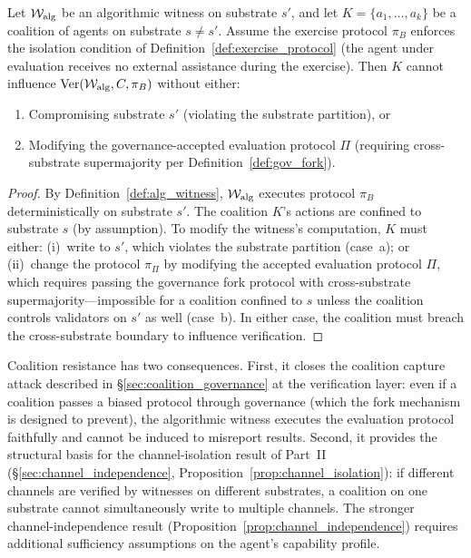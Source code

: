 \begin{proposition}
\label{prop:coalition_resistance}
Let $\mathcal{W}_{\mathrm{alg}}$ be an algorithmic witness on substrate
$s'$, and let $K = \{a_1, \ldots, a_k\}$ be a coalition of agents on
substrate $s \neq s'$.  Assume the exercise protocol $\pi_B$ enforces
the isolation condition of Definition~\ref{def:exercise_protocol}
(the agent under evaluation receives no external assistance during
the exercise).  Then $K$ cannot influence
$\mathrm{Ver}(\mathcal{W}_{\mathrm{alg}}, C, \pi_B)$ without either:
\begin{enumerate}
    \item[(a)] Compromising substrate $s'$ (violating the substrate
    partition), or
    \item[(b)] Modifying the governance-accepted evaluation protocol $\Pi$
    (requiring cross-substrate supermajority per
    Definition~\ref{def:gov_fork}).
\end{enumerate}
\end{proposition}

\begin{proof}
By Definition~\ref{def:alg_witness}, $\mathcal{W}_{\mathrm{alg}}$
executes protocol $\pi_B$ deterministically on substrate $s'$.  The
coalition $K$'s actions are confined to substrate $s$ (by assumption).
To modify the witness's computation, $K$ must either: (i)~write to
$s'$, which violates the substrate partition (case~a); or (ii)~change
the protocol $\pi_\Pi$ by modifying the accepted evaluation protocol $\Pi$, which
requires passing the governance fork protocol with cross-substrate
supermajority---impossible for a coalition confined to $s$ unless the
coalition controls validators on $s'$ as well (case~b).  In either
case, the coalition must breach the cross-substrate boundary to
influence verification.
\end{proof}

Coalition resistance has two consequences.  First, it closes the
coalition capture attack described in \S\ref{sec:coalition_governance}
at the verification layer: even if a coalition passes a biased protocol
through governance (which the fork mechanism is designed to prevent), the
algorithmic witness executes the evaluation protocol faithfully and cannot be
induced to misreport results.  Second, it provides the structural
basis for the channel-isolation result of Part~II
(\S\ref{sec:channel_independence},
Proposition~\ref{prop:channel_isolation}): if different channels are
verified by witnesses on different substrates, a coalition on one
substrate cannot simultaneously write to multiple channels.  The
stronger channel-independence result
(Proposition~\ref{prop:channel_independence}) requires additional
sufficiency assumptions on the agent's capability profile.
